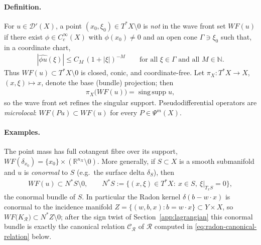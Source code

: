 \documentclass[12pt]{article}
\numberwithin{equation}{section}
\numberwithin{figure}{section}
\numberwithin{equation}{section}
\newcommand{\R}{\mathbb{R}}
\newcommand{\N}{\mathbb{N}}
\newcommand{\abs}[1]{\left|#1\right|}
\begin{document}
\paragraph{Definition.}
For $u\in\mathcal D'(X)$, a point $(x_0,\xi_0)\in T^*X\setminus0$ is
\emph{not} in the wave front set $WF(u)$ if there exist $\phi\in C_c^\infty(X)$
with $\phi(x_0)\neq0$ and an open cone $\Gamma\ni\xi_0$ such that, in a coordinate
chart,
\begin{align*}
    \abs{\widehat{\phi u}(\xi)}\le C_M\,(1+\abs\xi)^{-M}
    \qquad\text{for all }\xi\in\Gamma\text{ and all }M\in\N.
\end{align*}
Thus $WF(u)\subset T^*X\setminus0$ is closed, conic, and coordinate-free.  Let
$\pi_X:T^*X\to X$, $(x,\xi)\mapsto x$, denote the base (bundle) projection; then
\begin{align*}
    \pi_X\bigl(WF(u)\bigr)=\operatorname{sing\,supp}u,
\end{align*}
so the wave front set refines the singular support.  Pseudodifferential operators
are \emph{microlocal}: $WF(Pu)\subset WF(u)$ for every $P\in\Psi^m(X)$.

\paragraph{Examples.}
The point mass has full cotangent fibre over its support,
$WF(\delta_{x_0})=\{x_0\}\times(\R^{n_X}\setminus0)$.  More generally, if
$S\subset X$ is a smooth submanifold and $u$ is \emph{conormal} to $S$ (e.g.\ the
surface delta $\delta_S$), then
\begin{align}
    WF(u)\subset N^*S\setminus0,
    \qquad
    N^*S:=\bigl\{(x,\xi)\in T^*X:\ x\in S,\ \xi|_{T_xS}=0\bigr\},
    \label{eq:conormal-wf}
\end{align}
the conormal bundle of $S$.  In particular the Radon kernel $\delta(b-w\cdot x)$
is conormal to the incidence manifold $Z=\{(w,b,x):b=w\cdot x\}\subset Y\times X$,
so $WF\bigl(K_{\mathcal R}\bigr)\subset N^*Z\setminus0$; after the sign twist of
Section~\ref{app:lagrangian} this conormal bundle is exactly the canonical relation
$\mathcal{C}_{\mathcal R}$ of $\mathcal R$ computed in \eqref{eq:radon-canonical-relation}
below.
\end{document}
